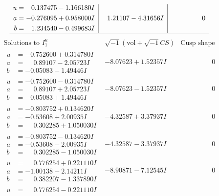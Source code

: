 \documentclass[1p]{elsarticle_modified}
\theoremstyle{definition}
\newcommand{\I}{\sqrt{-1}}
\begin{document}
$$\begin{array}{c|c|c}
\begin{aligned}
u &= \phantom{-}0.137475 - 1.166180 I \\
a &= -0.276095 + 0.958000 I \\
b &= \phantom{-}1.234540 - 0.499683 I\end{aligned}
 & \phantom{-}1.21107 - 4.31656 I & \phantom{-0.000000 } 0\\
 \hline 
 \end{array}$$\newpage$$\begin{array}{c|c|c}  
\text{Solutions to }I^u_{1}& \I (\text{vol} + \sqrt{-1}CS) & \text{Cusp shape}\\
 \hline 
\begin{aligned}
u &= -0.752600 + 0.314780 I \\
a &= \phantom{-}0.89107 - 2.05723 I \\
b &= -0.05083 - 1.49446 I\end{aligned}
 & -8.07623 + 1.52357 I & \phantom{-0.000000 } 0 \\ \hline\begin{aligned}
u &= -0.752600 - 0.314780 I \\
a &= \phantom{-}0.89107 + 2.05723 I \\
b &= -0.05083 + 1.49446 I\end{aligned}
 & -8.07623 - 1.52357 I & \phantom{-0.000000 } 0 \\ \hline\begin{aligned}
u &= -0.803752 + 0.134620 I \\
a &= -0.53608 + 2.00935 I \\
b &= \phantom{-}0.302285 + 1.050030 I\end{aligned}
 & -4.32587 + 3.37937 I & \phantom{-0.000000 } 0 \\ \hline\begin{aligned}
u &= -0.803752 - 0.134620 I \\
a &= -0.53608 - 2.00935 I \\
b &= \phantom{-}0.302285 - 1.050030 I\end{aligned}
 & -4.32587 - 3.37937 I & \phantom{-0.000000 } 0 \\ \hline\begin{aligned}
u &= \phantom{-}0.776254 + 0.221110 I \\
a &= -1.00138 - 2.14211 I \\
b &= \phantom{-}0.382207 - 1.337890 I\end{aligned}
 & -8.90871 - 7.12545 I & \phantom{-0.000000 } 0 \\ \hline\begin{aligned}
u &= \phantom{-}0.776254 - 0.221110 I \\

\end{aligned}
\end{array}$$
\end{document}

